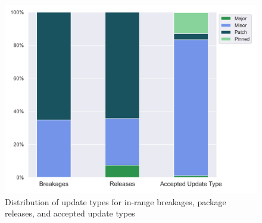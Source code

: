 \begin{figure}[h]
    \centering
    \includegraphics[width=\linewidth]{images/rq1_stacked.png}
    \caption{Distribution of update types for in-range breakages, package releases, and accepted update types}
    \label{fig:bar_stacked_breaks_releases_accepted_update_types}
\end{figure}
